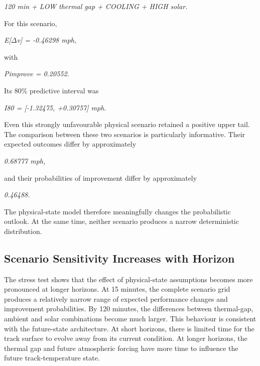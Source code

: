 \begin{center}\textit{120 min + LOW thermal gap + COOLING + HIGH solar.}\end{center}

For this scenario,

\begin{center}\textit{E[\ensuremath{\Delta}v] = -0.46298 mph,}\end{center}

with

\begin{center}\textit{Pimprove = 0.20552.}\end{center}

Its 80\% predictive interval was

\begin{center}\textit{I80 = [-1.32475, +0.30757] mph.}\end{center}

Even this strongly unfavourable physical scenario retained a positive upper tail. The comparison between these two scenarios is particularly informative. Their expected outcomes differ by approximately

\begin{center}\textit{0.68777 mph,}\end{center}

and their probabilities of improvement differ by approximately

\begin{center}\textit{0.46488.}\end{center}

The physical-state model therefore meaningfully changes the probabilistic outlook. At the same time, neither scenario produces a narrow deterministic distribution.

\subsection{Scenario Sensitivity Increases with Horizon}
The stress test shows that the effect of physical-state assumptions becomes more pronounced at longer horizons. At 15 minutes, the complete scenario grid produces a relatively narrow range of expected performance changes and improvement probabilities. By 120 minutes, the differences between thermal-gap, ambient and solar combinations become much larger. This behaviour is consistent with the future-state architecture. At short horizons, there is limited time for the track surface to evolve away from its current condition. At longer horizons, the thermal gap and future atmospheric forcing have more time to influence the future track-temperature state.

